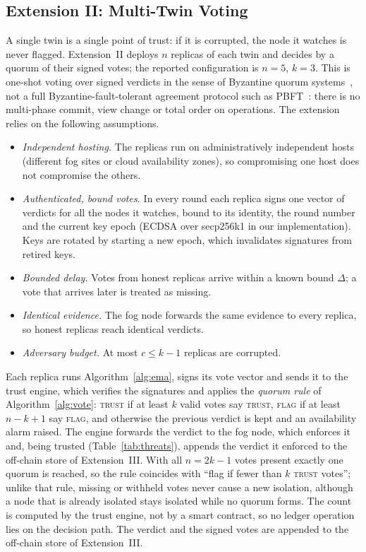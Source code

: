\subsection{Extension II: Multi-Twin Voting}
\label{sec:ext2}
A single twin is a single point of trust: if it is corrupted, the
node it watches is never flagged.  Extension~II deploys $n$ replicas
of each twin and decides by a quorum of their signed votes; the
reported configuration is $n=5$, $k=3$.  This is one-shot voting over
signed verdicts in the sense of Byzantine quorum
systems~\cite{malkhi1998byzantine}, not a full Byzantine-fault-tolerant
agreement protocol such as PBFT~\cite{castro2002practical}: there is no
multi-phase commit, view change or total order on operations.  The
extension relies on the following assumptions.
\begin{itemize}
\item[(B1)] \emph{Independent hosting.}  The replicas run on
administratively independent hosts (different fog sites or cloud
availability zones), so compromising one host does not compromise the
others.
\item[(B2)] \emph{Authenticated, bound votes.}  In every round each
replica signs one vector of verdicts for all the nodes it watches,
bound to its identity, the round number and the current key epoch
(ECDSA over secp256k1 in our implementation).  Keys are rotated by
starting a new epoch, which invalidates signatures from retired keys.
\item[(B3)] \emph{Bounded delay.}  Votes from honest replicas arrive
within a known bound $\Delta$; a vote that arrives later is treated as
missing.
\item[(B4)] \emph{Identical evidence.}  The fog node forwards the same
evidence to every replica, so honest replicas reach identical
verdicts.
\item[(B5)] \emph{Adversary budget.}  At most $c\le k-1$ replicas are
corrupted.
\end{itemize}
Each replica runs Algorithm~\ref{alg:ema}, signs its vote vector and
sends it to the trust engine, which verifies the signatures and
applies the \emph{quorum rule} of Algorithm~\ref{alg:vote}:
\textsc{trust} if at least $k$ valid votes say \textsc{trust},
\textsc{flag} if at least $n-k+1$ say \textsc{flag}, and otherwise the
previous verdict is kept and an availability alarm raised.
The engine forwards the verdict to the fog node, which enforces it
and, being trusted (Table~\ref{tab:threats}), appends the verdict it
enforced to the off-chain store of Extension~III.  With all
$n=2k-1$ votes present exactly one quorum is reached, so the rule
coincides with ``flag if fewer than $k$ \textsc{trust} votes''; unlike
that rule, missing or withheld votes never cause a new isolation,
although a node that is already isolated stays isolated while no
quorum forms.  The count is computed by the trust engine, not by a smart
contract, so no ledger operation lies on the decision path.  The
verdict and the signed votes are appended to the off-chain store of
Extension~III.

